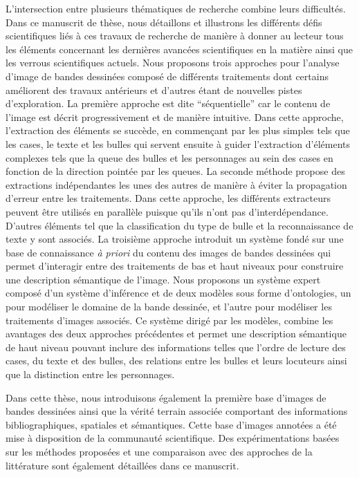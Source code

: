 L'intersection entre plusieurs thématiques de recherche combine leurs difficultés.
Dans ce manuscrit de thèse, nous détaillons et illustrons les différents défis scientifiques liés à ces travaux de recherche de manière à donner au lecteur tous les éléments concernant les dernières avancées scientifiques en la matière ainsi que les verrous scientifiques actuels. 
Nous proposons trois approches pour l'analyse d'image de bandes dessinées composé de différents traitements dont certains améliorent des travaux antérieurs et d'autres étant de nouvelles pistes d'exploration.
La première approche est dite ``séquentielle'' car le contenu de l'image est décrit progressivement et de manière intuitive.
Dans cette approche, l'extraction des éléments se succède, en commençant par les plus simples tels que les cases, le texte et les bulles qui servent ensuite à guider l'extraction d'éléments complexes tels que la queue des bulles et les personnages au sein des cases en fonction de la direction pointée par les queues.
La seconde méthode propose des extractions indépendantes les unes des autres de manière à éviter la propagation d'erreur entre les traitements.
Dans cette approche, les différents extracteurs peuvent être utilisés en parallèle puisque qu'ils n'ont pas d'interdépendance.
D'autres éléments tel que la classification du type de bulle et la reconnaissance de texte y sont associés.
La troisième approche introduit un système fondé sur une base de connaissance \emph{à priori} du contenu des images de bandes dessinées qui permet d'interagir entre des traitements de bas et haut niveaux pour construire une description sémantique de l'image.
Nous proposons un système expert composé d'un système d'inférence et de deux modèles sous forme d'ontologies, un pour modéliser le domaine de la bande dessinée, et l'autre pour modéliser les traitements d'images associés.
Ce système dirigé par les modèles, combine les avantages des deux approches précédentes et permet une description sémantique de haut niveau pouvant inclure des informations telles que l'ordre de lecture des cases, du texte et des bulles, des relations entre les bulles  et leurs locuteurs ainsi que la distinction entre les personnages.

Dans cette thèse, nous introduisons également la première base d'images de bandes dessinées ainsi que la vérité terrain associée comportant des informations bibliographiques, spatiales et sémantiques.
Cette base d'images annotées a été mise à disposition de la communauté scientifique.
Des expérimentations basées sur les méthodes proposées et une comparaison avec des approches de la littérature sont également détaillées dans ce manuscrit.



\clearpage\thispagestyle{empty}